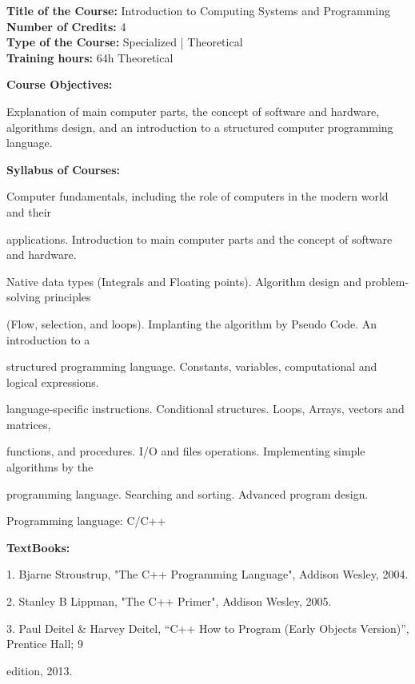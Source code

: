 \documentclass[12pt,a4paper]{article}
\begin{document}
\newpage
\textbf{Title of the Course:} Introduction to Computing Systems and Programming\\
\textbf{Number of Credits:} 4\\
\textbf{Type of the Course:} Specialized | Theoretical\\
\textbf{Training hours:} 64h Theoretical\par\vspace{4pt}
\textbf{Course Objectives:}\par\vspace{2pt}
Explanation of main computer parts, the concept of software and hardware, algorithms design, and
an introduction to a structured computer programming language.\par\vspace{4pt}
\textbf{Syllabus of Courses:}\par\vspace{2pt}
Computer fundamentals, including the role of computers in the modern world and their\par
applications. Introduction to main computer parts and the concept of software and hardware.\par
Native data types (Integrals and Floating points). Algorithm design and problem-solving principles\par
(Flow, selection, and loops). Implanting the algorithm by Pseudo Code. An introduction to a\par
structured programming language. Constants, variables, computational and logical expressions.\par
language-specific instructions. Conditional structures. Loops, Arrays, vectors and matrices,\par
functions, and procedures. I/O and files operations. Implementing simple algorithms by the\par
programming language. Searching and sorting. Advanced program design.\par
Programming language: C/C++\par\vspace{4pt}
\textbf{TextBooks:}\par\vspace{2pt}
1. Bjarne Stroustrup, "The C++ Programming Language", Addison Wesley, 2004.\par
2. Stanley B Lippman, "The C++ Primer", Addison Wesley, 2005.\par
3. Paul Deitel \& Harvey Deitel, “C++ How to Program (Early Objects Version)”, Prentice Hall; 9\par
edition, 2013.\par
\vspace{4pt}
\end{document}
